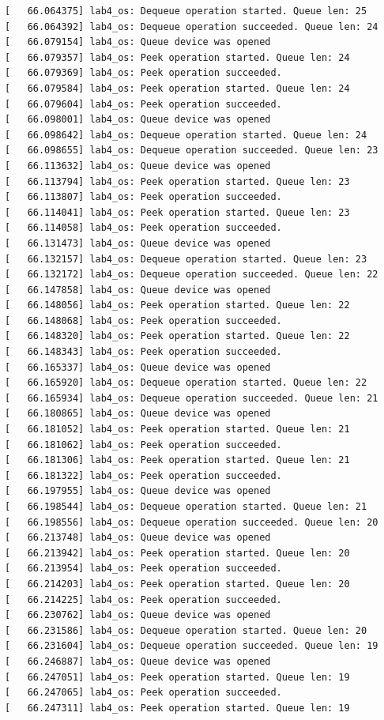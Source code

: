 \documentclass[a4paper,14pt]{extarticle}
\begin{document}
\begin{verbatim}
[   66.064375] lab4_os: Dequeue operation started. Queue len: 25
[   66.064392] lab4_os: Dequeue operation succeeded. Queue len: 24
[   66.079154] lab4_os: Queue device was opened
[   66.079357] lab4_os: Peek operation started. Queue len: 24
[   66.079369] lab4_os: Peek operation succeeded.
[   66.079584] lab4_os: Peek operation started. Queue len: 24
[   66.079604] lab4_os: Peek operation succeeded.
[   66.098001] lab4_os: Queue device was opened
[   66.098642] lab4_os: Dequeue operation started. Queue len: 24
[   66.098655] lab4_os: Dequeue operation succeeded. Queue len: 23
[   66.113632] lab4_os: Queue device was opened
[   66.113794] lab4_os: Peek operation started. Queue len: 23
[   66.113807] lab4_os: Peek operation succeeded.
[   66.114041] lab4_os: Peek operation started. Queue len: 23
[   66.114058] lab4_os: Peek operation succeeded.
[   66.131473] lab4_os: Queue device was opened
[   66.132157] lab4_os: Dequeue operation started. Queue len: 23
[   66.132172] lab4_os: Dequeue operation succeeded. Queue len: 22
[   66.147858] lab4_os: Queue device was opened
[   66.148056] lab4_os: Peek operation started. Queue len: 22
[   66.148068] lab4_os: Peek operation succeeded.
[   66.148320] lab4_os: Peek operation started. Queue len: 22
[   66.148343] lab4_os: Peek operation succeeded.
[   66.165337] lab4_os: Queue device was opened
[   66.165920] lab4_os: Dequeue operation started. Queue len: 22
[   66.165934] lab4_os: Dequeue operation succeeded. Queue len: 21
[   66.180865] lab4_os: Queue device was opened
[   66.181052] lab4_os: Peek operation started. Queue len: 21
[   66.181062] lab4_os: Peek operation succeeded.
[   66.181306] lab4_os: Peek operation started. Queue len: 21
[   66.181322] lab4_os: Peek operation succeeded.
[   66.197955] lab4_os: Queue device was opened
[   66.198544] lab4_os: Dequeue operation started. Queue len: 21
[   66.198556] lab4_os: Dequeue operation succeeded. Queue len: 20
[   66.213748] lab4_os: Queue device was opened
[   66.213942] lab4_os: Peek operation started. Queue len: 20
[   66.213954] lab4_os: Peek operation succeeded.
[   66.214203] lab4_os: Peek operation started. Queue len: 20
[   66.214225] lab4_os: Peek operation succeeded.
[   66.230762] lab4_os: Queue device was opened
[   66.231586] lab4_os: Dequeue operation started. Queue len: 20
[   66.231604] lab4_os: Dequeue operation succeeded. Queue len: 19
[   66.246887] lab4_os: Queue device was opened
[   66.247051] lab4_os: Peek operation started. Queue len: 19
[   66.247065] lab4_os: Peek operation succeeded.
[   66.247311] lab4_os: Peek operation started. Queue len: 19

\end{verbatim}
\end{document}
